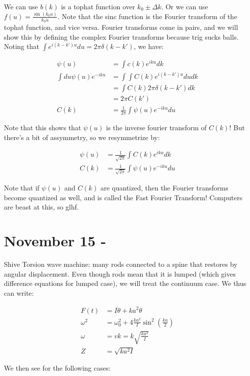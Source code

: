 \documentclass{report}
\begin{document}
We can use $b(k)$ is a tophat function over $k_0 \pm \Delta k$. Or we can use $f(u) = \frac{\sin(k_0u)}{k_0u}$. Note that the sinc function is the Fourier transform of the tophat function, and vice versa. Fourier transforms come in pairs, and we will show this by defining the complex Fourier transforms because trig sucks balls. Noting that $\int{e^{i(k-k')u}du} = 2\pi \delta(k-k')$, we have:

\begin{align*}
\psi(u) &= \int{c(k) e^{iku} dk}\\
\int{du \psi(u) e^{-iku}} &= \int{\int{C(k)e^{i(k-k')u}du}}dk\\
&= \int{C(k)2\pi \delta(k-k')dk}\\
&= 2\pi C(k')\\
C(k) &= \frac{1}{2\pi} \int{\psi(u) e^{-iku} du}
\end{align*}

Note that this shows that $\psi(u)$ is the inverse fourier transform of $C(k)$! But there's a bit of assymmetry, so we resymmetrize by:

\begin{align*}
\psi(u) &= \frac{1}{\sqrt{2\pi}}\int{C(k)e^{iku}dk}\\
C(k) &= \frac{1}{\sqrt{2\pi}}\int{\psi(u)e^{-iku}du}
\end{align*}

Note that if $\psi(u)$ and $C(k)$ are quantized, then the Fourier transforms become quantized as well, and is called the Fast Fourier Transform! Computers are beast at this, so glhf.

\chapter{November 15 - }

Shive Torsion wave machine: many rods connected to a spine that restores by angular displacement. Even though rods mean that it is lumped (which gives difference equations for lumped case), we will treat the continuum case. We thus can write:

\begin{align*}
F(t) &= I\ddot{\theta} + k a^2 \theta\\
\omega^2 &= \omega_0^2 + 4\frac{ka^2}{I}\sin^2\left(\frac{ka}{2}\right)\\
\omega &= vk = k\sqrt{\frac{ka^2}{I}}\\
Z &= \sqrt{ka^2I}
\end{align*}

We then see for the following cases:
\end{document}
